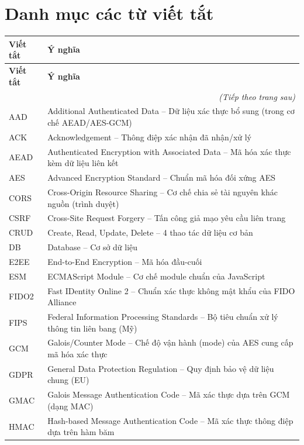 \chapter*{Danh mục các từ viết tắt}
\begin{longtable}{@{}p{}p{}@{}}
\toprule
\textbf{Viết tắt} & \textbf{Ý nghĩa} \\
\midrule
\endfirsthead
\toprule
\textbf{Viết tắt} & \textbf{Ý nghĩa} \\
\midrule
\endhead
\midrule
\multicolumn{2}{r}{\textit{(Tiếp theo trang sau)}}\\
\endfoot
\bottomrule
\endlastfoot

AAD   & Additional Authenticated Data -- Dữ liệu xác thực bổ sung (trong cơ chế AEAD/AES-GCM) \\
ACK   & Acknowledgement -- Thông điệp xác nhận đã nhận/xử lý \\
AEAD  & Authenticated Encryption with Associated Data -- Mã hóa xác thực kèm dữ liệu liên kết \\
AES   & Advanced Encryption Standard -- Chuẩn mã hóa đối xứng AES \\
CORS  & Cross-Origin Resource Sharing -- Cơ chế chia sẻ tài nguyên khác nguồn (trình duyệt) \\
CSRF  & Cross-Site Request Forgery -- Tấn công giả mạo yêu cầu liên trang \\
CRUD  & Create, Read, Update, Delete -- 4 thao tác dữ liệu cơ bản \\
DB    & Database -- Cơ sở dữ liệu \\
E2EE  & End-to-End Encryption -- Mã hóa đầu-cuối \\
ESM   & ECMAScript Module -- Cơ chế module chuẩn của JavaScript \\
FIDO2 & Fast IDentity Online 2 -- Chuẩn xác thực không mật khẩu của FIDO Alliance \\
FIPS  & Federal Information Processing Standards -- Bộ tiêu chuẩn xử lý thông tin liên bang (Mỹ) \\
GCM   & Galois/Counter Mode -- Chế độ vận hành (mode) của AES cung cấp mã hóa xác thực \\
GDPR  & General Data Protection Regulation -- Quy định bảo vệ dữ liệu chung (EU) \\
GMAC  & Galois Message Authentication Code -- Mã xác thực dựa trên GCM (dạng MAC) \\
HMAC  & Hash-based Message Authentication Code -- Mã xác thực thông điệp dựa trên hàm băm \\

\end{longtable}
